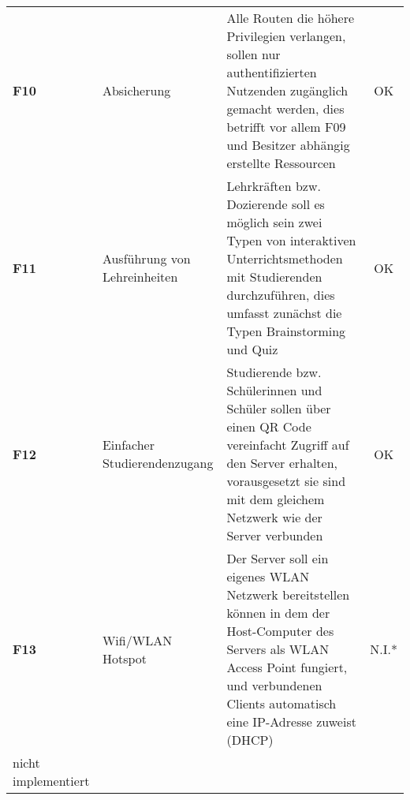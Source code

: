 \begin{longtable}{llXc}
   \rowcolor[HTML]{EFEFEF}
   \textbf{F10}         & Absicherung                                               & Alle Routen die höhere Privilegien verlangen, sollen nur authentifizierten Nutzenden zugänglich gemacht werden, dies betrifft vor allem F09 und Besitzer abhängig erstellte Ressourcen                                                                                                & OK              \\
   \rowcolor[HTML]{FFFFFF}
   \textbf{F11}         & Ausführung von Lehreinheiten                              & Lehrkräften bzw. Dozierende soll es möglich sein zwei Typen von interaktiven Unterrichtsmethoden mit Studierenden durchzuführen, dies umfasst zunächst die Typen Brainstorming und Quiz                                                                                          & OK              \\
   \rowcolor[HTML]{EFEFEF}
   \textbf{F12}         & Einfacher Studierendenzugang                              & Studierende bzw. Schülerinnen und Schüler sollen über einen QR Code vereinfacht Zugriff auf den Server erhalten, vorausgesetzt sie sind mit dem gleichem Netzwerk wie der Server verbunden                                                                                     & OK              \\
   \rowcolor[HTML]{FFFFFF}
   \textbf{F13}         & Wifi/WLAN Hotspot                                         & Der Server soll ein eigenes WLAN Netzwerk bereitstellen können in dem der Host-Computer des Servers als WLAN Access Point fungiert, und verbundenen Clients automatisch eine IP-Adresse zuweist (DHCP)                                                                             & N.I.*        \\ \bottomrule
 
 
 \footnotesize * nicht implementiert
\end{longtable}